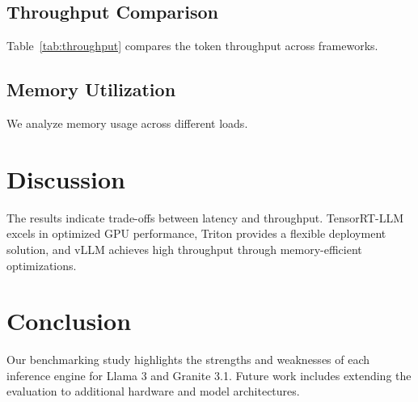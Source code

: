 \documentclass[11pt, oneside]{article}   	%
\begin{document}
\subsection{Throughput Comparison}
Table~\ref{tab:throughput} compares the token throughput across frameworks.

\subsection{Memory Utilization}
We analyze memory usage across different loads.

\section{Discussion}
The results indicate trade-offs between latency and throughput. TensorRT-LLM excels in optimized GPU performance, Triton provides a flexible deployment solution, and vLLM achieves high throughput through memory-efficient optimizations.

\section{Conclusion}
Our benchmarking study highlights the strengths and weaknesses of each inference engine for Llama 3 and Granite 3.1. Future work includes extending the evaluation to additional hardware and model architectures.




\end{document}
